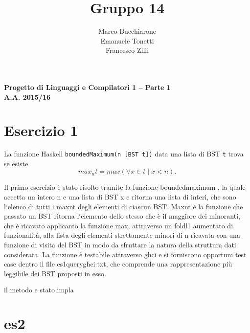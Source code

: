\documentclass[a4paper, oneside, 11pt]{article}
\makeatletter
\renewcommand\and{\\}
\renewcommand\maketitle{%
\bigskip\bigskip\bigskip\bigskip%
\begin{center}\bfseries\large%
Progetto di Linguaggi e Compilatori 1 -- Parte 1 \\ A.A. 2015/16\\%
\end{center}%
\bigskip%
\begin{center}\bfseries\LARGE \@title  \end{center}%
\bigskip%
\begin{center}\bfseries\large \@author \end{center}%
\bigskip\bigskip}
\makeatother
\begin{document}
\title{Gruppo 14}
\author{Marco Bucchiarone \and Emanuele Tonetti \and Francesco Zilli}
\maketitle
\section{Esercizio 1}
La funzione Haskell \texttt{boundedMaximum(n [BST t])} data una lista di BST \texttt{t} trova se esiste  \[max_{n}{t}=max(\forall x \in t \mid  x<n ).\]

Il primo esercizio \`e stato risolto tramite la funzione boundedmaximum , la quale accetta un intero n e una lista di BST x e ritorna una lista di interi, che sono l`elenco di tutti i maxnt degli elementi di ciascun BST. Maxnt \`e la funzione che passato un BST ritorna l`elemento dello stesso che \`e il maggiore dei minoranti, che \`e ricavato applicanto la funzione max, attraverso un foldl1 aumentato di funzionalit\`a, alla lista degli elementi strettamente minori di n ricavata con una funzione di visita del BST in modo da sfruttare la natura della struttura dati considerata. La funzione \`e testabile attraverso ghci e si forniscono opportuni test case dentro il file es1queryghci.txt, che comprende una rappresentazione più leggibile dei BST proposti in esso.

il metodo e stato impla

\section{es2}
\end{document}
